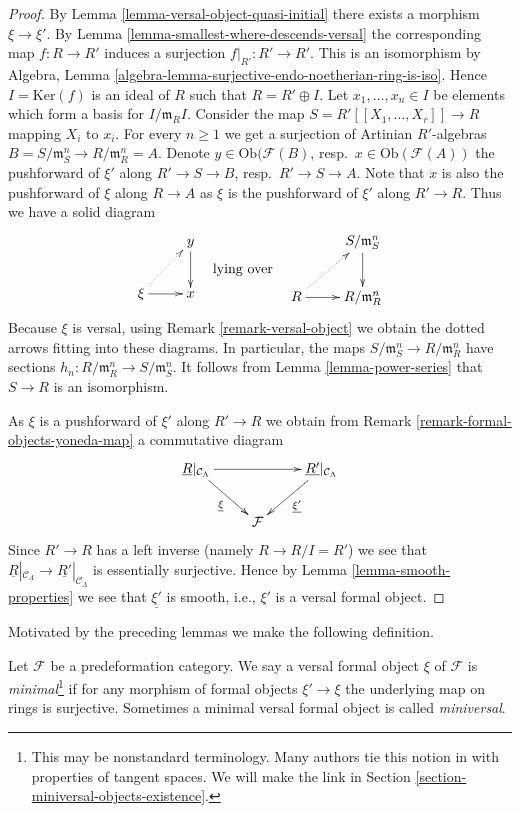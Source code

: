\begin{proof}
By
Lemma \ref{lemma-versal-object-quasi-initial}
there exists a morphism $\xi \to \xi'$. By
Lemma \ref{lemma-smallest-where-descends-versal}
the corresponding map $f : R \to R'$ induces a surjection
$f|_{R'} : R' \to R'$. This is an isomorphism by
Algebra, Lemma \ref{algebra-lemma-surjective-endo-noetherian-ring-is-iso}.
Hence $I = \text{Ker}(f)$ is an ideal of $R$ such that $R = R' \oplus I$.
Let $x_1, \ldots, x_n \in I$ be elements which form a basis for
$I/\mathfrak m_RI$. Consider the map
$S = R'[[X_1, \ldots, X_r]] \to R$ mapping $X_i$ to $x_i$.
For every $n \geq 1$ we get a surjection of Artinian $R'$-algebras
$B = S/\mathfrak m_S^n \to R/\mathfrak m_R^n = A$. Denote
$y \in \text{Ob}(\mathcal{F}(B)$, resp.\ $x \in \text{Ob}(\mathcal{F}(A))$
the pushforward of $\xi'$ along $R' \to S \to B$, resp.\ $R' \to S \to A$.
Note that $x$ is also the pushforward of $\xi$ along $R \to A$ as
$\xi$ is the pushforward of $\xi'$ along $R' \to R$.
Thus we have a solid diagram
$$
\vcenter{
\xymatrix{
& y \ar[d] \\
\xi \ar[r] \ar@{..>}[ru] & x
}
}
\quad\text{lying over}\quad
\vcenter{
\xymatrix{
& S/\mathfrak m_S^n \ar[d] \\
R \ar[r] \ar@{..>}[ru] & R/\mathfrak m_R^n
}
}
$$
Because $\xi$ is versal, using
Remark \ref{remark-versal-object}
we obtain the dotted arrows fitting into these diagrams.
In particular, the maps $S/\mathfrak m_S^n \to R/\mathfrak m_R^n$
have sections $h_n : R/\mathfrak m_R^n \to S/\mathfrak m_S^n$.
It follows from
Lemma \ref{lemma-power-series}
that $S \to R$ is an isomorphism.

\medskip\noindent
As $\xi$ is a pushforward of $\xi'$ along $R' \to R$ we obtain from
Remark \ref{remark-formal-objects-yoneda-map}
a commutative diagram
$$
\xymatrix{
\underline{R}|_{\mathcal{C}_\Lambda} \ar[rr] \ar[rd]_{\underline{\xi}} & &
\underline{R'}|_{\mathcal{C}_\Lambda} \ar[ld]^{\underline{\xi'}} \\
& \mathcal{F}
}
$$
Since $R' \to R$ has a left inverse (namely $R \to R/I = R'$) we see that
$\underline{R}|_{\mathcal{C}_\Lambda} \to
\underline{R'}|_{\mathcal{C}_\Lambda}$ is essentially surjective.
Hence by
Lemma \ref{lemma-smooth-properties}
we see that $\underline{\xi'}$ is smooth, i.e., $\xi'$ is a versal
formal object.
\end{proof}

\noindent
Motivated by the preceding lemmas we make the following definition.

\begin{definition}
\label{definition-minimal-versal}
Let $\mathcal{F}$ be a predeformation category.
We say a versal formal object $\xi$ of $\mathcal{F}$ is
{\it minimal}\footnote{This may be nonstandard terminology. Many
authors tie this notion in with properties of tangent spaces.
We will make the link in
Section \ref{section-miniversal-objects-existence}.}
if for any morphism of formal objects
$\xi' \to \xi$ the underlying map on rings is surjective.
Sometimes a minimal versal formal object is called {\it miniversal}.
\end{definition}

